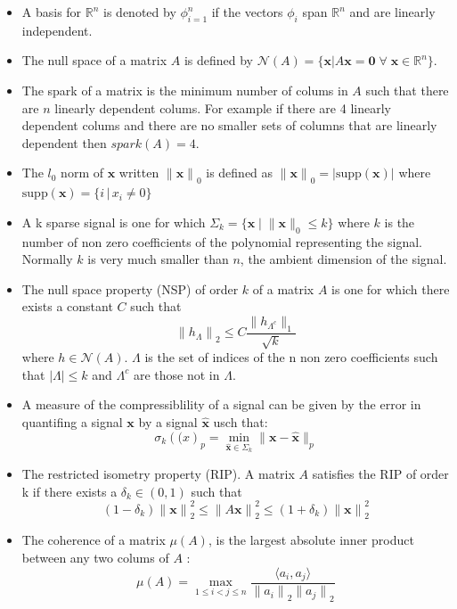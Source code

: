 \documentclass[11pt,twoside,a4paper]{article}
\newcommand{\supp}{\text{supp}}
\begin{document}
\begin{itemize}
	\item A basis for $\mathbb{R}^n$ is denoted by ${\phi}_{i=1}^n$ if the vectors $\phi_i$ span $\mathbb{R}^n$ and are linearly independent.
	\item The null space of a matrix $A$ is defined by $\mathcal{N}(A)=\{\mathbf{x}\lvert A\mathbf{x}=\mathbf{0}\; \forall\; \mathbf{x} \in \mathbb{R}^n\}$.
	\item The spark of a matrix is the minimum number of colums in $A$ such that there are $n$ linearly dependent colums. For example if there are 4 	linearly dependent colums and there are no smaller sets of columns that are linearly dependent then $\mathit{spark}(A)=4$.
	\item The $l_0$ norm of $\mathbf{x}$ written ${\lVert \mathbf{x} \rVert}_0$ is defined as ${\lVert \mathbf{x} \rVert}_0=\lvert \supp(\mathbf{x})\rvert$ where $\supp(\mathbf{x})=\{i \,\vert\,x_i\neq 0\}$
	\item A k sparse signal is one for which ${\Sigma}_k=\{\mathbf{x}\;\vert \; \lVert \mathbf{x} \rVert_0 \leq k \}$ where $k$ is the number of non zero coefficients of the polynomial representing the signal. Normally $k$ is very much smaller than $n$, the ambient dimension of the signal.
	\item The null space property (NSP) of order $k$ of a matrix $A$ is one for which there exists a constant $C$ such that
		\begin{equation}
			{\lVert h_{\Lambda}\rVert}_2\leq C\frac{\lVert h_{{\Lambda}^c}\rVert_1}{\sqrt{k}}
		\end{equation}
	where $h \in \mathcal{N}(A)$. $\Lambda$ is the set of indices of the n non zero coefficients such that $\lvert \Lambda \rvert \leq k$ and ${\Lambda}^c$ are those not in $\Lambda$.
	\item A measure of the compressiblility of a signal can be given by the error in quantifing a signal $\mathbf{x}$ by a signal $\hat{\mathbf{x}}$ usch that:
		\begin{equation}
			{\sigma}_k {(\mathbf(x)}_p=\min_{\hat{\mathbf{x}}\in {\Sigma}_k} \lVert \mathbf{x}-\hat{\mathbf{x}} \rVert_p
		\end{equation}
	\item The restricted isometry property (RIP). A matrix $A$ satisfies the RIP of order k if there exists a $\delta_k \in (0,1)$ such that
		\begin{equation}
			(1-\delta_k){\lVert \mathbf{x} \rVert}_2^2 \leq {\lVert A\mathbf{x} \rVert}_2^2 \leq (1+ \delta_k){\lVert \mathbf{x} \rVert}_2^2
		\end{equation}
	\item The coherence of a matrix $\mu(A)$, is the largest absolute inner product between any two colums of $A$ :
		\begin{equation}
			\mu(A)=\max_{1\leq i < j \leq n}\frac{\langle a_i,a_j \rangle}{{\lVert a_i \rVert}_2{\lVert a_j \rVert}_2}
		\end{equation}
\end{itemize}
\end{document}

